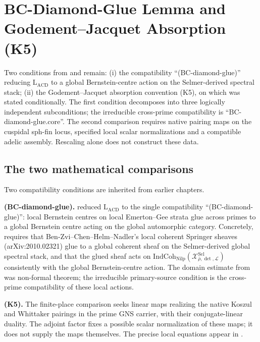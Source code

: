 \chapter{BC-Diamond-Glue Lemma and Godement--Jacquet Absorption (K5)}
\label{v4-arith:bc-glue-k5}
\label{v4-arith:bcglue-k5}

Two conditions from  and
 remain: (i) the compatibility
``(BC-diamond-glue)'' reducing \(\mathrm{L}_{\mathrm{ACD}}\) to a
global Bernstein-centre action on the Selmer-derived spectral stack;
(ii) the Godement--Jacquet absorption convention (K5), on which
 was stated conditionally.
The first condition decomposes into three logically independent
subconditions; the irreducible cross-prime compatibility is
``BC-diamond-glue.core''. The second comparison requires native
pairing maps on the cuspidal sph-fin locus, specified local scalar
normalizations and a compatible adelic assembly. Rescaling alone does
not construct these data.

\section{The two mathematical comparisons}
\label{v4-arith:bcglue-k5:context}

Two compatibility conditions are inherited from earlier chapters.

\textbf{(BC-diamond-glue).}
 reduced
\(\mathrm{L}_{\mathrm{ACD}}\) to the single compatibility
``(BC-diamond-glue)'': local Bernstein centres on local
Emerton--Gee strata glue across primes to a global Bernstein centre
acting on the global automorphic category. Concretely,
 requires that
Ben-Zvi--Chen--Helm--Nadler's local coherent Springer sheaves
(arXiv:2010.02321) glue to a global coherent sheaf on the
Selmer-derived global spectral stack, and that the glued sheaf acts on
\(\mathrm{IndCoh}_{\mathrm{Nilp}}(\mathcal{X}^{\mathrm{Sel}}_{\bar\rho,\det,\mathcal{L}})\)
consistently with the global Bernstein-centre action. The domain estimate
from  was non-formal theorem;
the irreducible primary-source condition is the cross-prime
compatibility of these local actions.

\textbf{(K5).}
The finite-place comparison seeks linear maps realizing the native
Koszul and Whittaker pairings in the prime GNS carrier, with their
conjugate-linear duality. The adjoint factor fixes a possible scalar
normalization of these maps; it does not supply the maps themselves.
The precise local equations appear in
.

